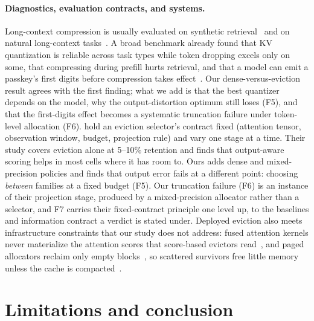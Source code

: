 \documentclass{article}
\theoremstyle{definition}
\begin{document}
\paragraph{Diagnostics, evaluation contracts, and systems.}
Long-context compression is usually evaluated on synthetic retrieval~\citep{hsieh2024ruler} and on natural long-context tasks~\citep{bai2025longbenchv2}.  
A broad benchmark already found that KV quantization is reliable across task types while token dropping excels only on some, that compressing during prefill hurts retrieval, and that a model can emit a passkey's first digits before compression takes effect~\citep{yuan2024kvbench}.  
Our dense-versus-eviction result agrees with the first finding; what we add is that the best quantizer depends on the model, why the output-distortion optimum still loses (F5), and that the first-digits effect becomes a systematic truncation failure under token-level allocation (F6).  
\citet{zhang2026fixedcontract} hold an eviction selector's contract fixed (attention tensor, observation window, budget, projection rule) and vary one stage at a time. %
Their study covers eviction alone at 5--10\% retention and finds that output-aware scoring helps in most cells where it has room to.  
Ours adds dense and mixed-precision policies and finds that output error fails at a different point: choosing \emph{between} families at a fixed budget (F5).  
Our truncation failure (F6) is an instance of their projection stage, produced by a mixed-precision allocator rather than a selector, and F7 carries their fixed-contract principle one level up, to the baselines and information contract a verdict is stated under.  
Deployed eviction also meets infrastructure constraints that our study does not address: fused attention kernels never materialize the attention scores that score-based evictors read~\citep{dao2023flashattention2,shah2024flashattention3,zhang2024sageattention}, and paged allocators reclaim only empty blocks~\citep{kwon2023vllm}, so scattered survivors free little memory unless the cache is compacted~\citep{mao2026triattention}.

\section{Limitations and conclusion}
\label{sec:conclusion}
\end{document}
